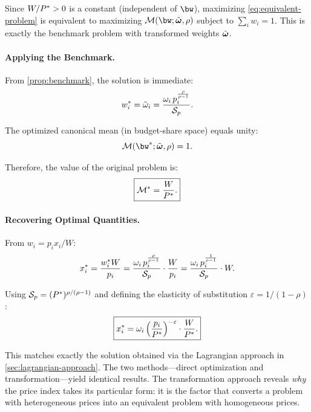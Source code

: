 Since $W/P^{*} > 0$ is a constant (independent of $\bw$), maximizing \cref{eq:equivalent-problem} is equivalent to maximizing $\M(\bw; \tilde{\bom}, \rho)$ subject to $\sum_i w_i = 1$. This is exactly the benchmark problem with transformed weights $\tilde{\boldsymbol{\omega}}$.

\paragraph{Applying the Benchmark.}
From \cref{prop:benchmark}, the solution is immediate:
\begin{equation}
\label{eq:optimal-shares-transform}
w_i^* = \tilde{\omega}_i = \frac{\omega_i \, p_i^{\frac{\rho}{\rho-1}}}{\mathcal{S}_p}.
\end{equation}

The optimized canonical mean (in budget-share space) equals unity:
\[
\M(\bw^*; \tilde{\bom}, \rho) = 1.
\]

Therefore, the value of the original problem is:
\begin{equation}
\label{eq:optimal-value-transform}
\boxed{\mathcal{M}^* = \frac{W}{P^{*}}.}
\end{equation}

\paragraph{Recovering Optimal Quantities.}
From $w_i = p_i x_i / W$:
\begin{equation}
\label{eq:optimal-quantities-transform}
x_i^* = \frac{w_i^* W}{p_i} = \frac{\omega_i \, p_i^{\frac{\rho}{\rho-1}}}{\mathcal{S}_p} \cdot \frac{W}{p_i} = \frac{\omega_i \, p_i^{\frac{1}{\rho-1}}}{\mathcal{S}_p} \cdot W.
\end{equation}

Using $\mathcal{S}_p = (P^{*})^{\rho/(\rho-1)}$ and defining the elasticity of substitution $\varepsilon = 1/(1-\rho)$:
\begin{equation}
\label{eq:optimal-x-final}
\boxed{x_i^* = \omega_i \left( \frac{p_i}{P^{*}} \right)^{-\varepsilon} \cdot \frac{W}{P^{*}}.}
\end{equation}

\begin{calloutimportant}[Verification]
This matches exactly the solution obtained via the Lagrangian approach in \cref{sec:lagrangian-approach}. The two methods---direct optimization and transformation---yield identical results. The transformation approach reveals \emph{why} the price index takes its particular form: it is the factor that converts a problem with heterogeneous prices into an equivalent problem with homogeneous prices.
\end{calloutimportant}

